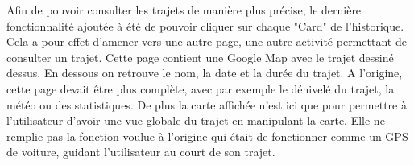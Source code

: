 Afin de pouvoir consulter les trajets de manière plus précise, le dernière fonctionnalité ajoutée à été de pouvoir cliquer sur chaque "Card"
de l'historique. Cela a pour effet d'amener vers une autre page, une autre activité permettant de consulter un trajet. Cette page contient
une Google Map avec le trajet dessiné dessus. En dessous on retrouve le nom, la date et la durée du trajet. A l'origine, cette page devait
être plus complète, avec par exemple le dénivelé du trajet, la météo ou des statistiques. De plus la carte affichée n'est ici que pour
permettre à l'utilisateur d'avoir une vue globale du trajet en manipulant la carte. Elle ne remplie pas la fonction voulue à l'origine
qui était de fonctionner comme un GPS de voiture, guidant l'utilisateur au court de son trajet.
